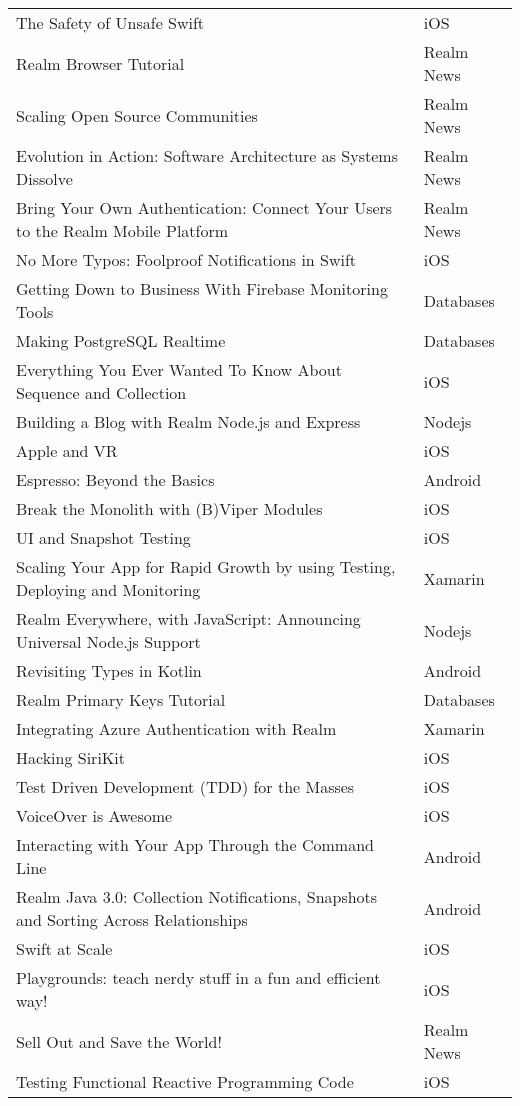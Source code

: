 \documentclass[letterpaper,11pt]{article}
\begin{document}
\begin{table}[htb]
\begin{tabular}{ | l | l |}
The Safety of Unsafe Swift & iOS \\ 
Realm Browser Tutorial & Realm News \\ 
Scaling Open Source Communities & Realm News \\ 
Evolution in Action: Software Architecture as Systems Dissolve & Realm News \\ 
Bring Your Own Authentication: Connect Your Users to the Realm Mobile Platform & Realm News \\ 
No More Typos: Foolproof Notifications in Swift & iOS \\ 
Getting Down to Business With Firebase Monitoring Tools & Databases \\ 
Making PostgreSQL Realtime & Databases \\ 
Everything You Ever Wanted To Know About Sequence and Collection & iOS \\ 
Building a Blog with Realm Node.js and Express & Nodejs \\ 
Apple and VR & iOS \\ 
Espresso: Beyond the Basics & Android  \\ 
Break the Monolith with (B)Viper Modules & iOS \\ 
UI and Snapshot Testing & iOS \\ 
Scaling Your App for Rapid Growth by using Testing, Deploying and Monitoring & Xamarin \\ 
Realm Everywhere, with JavaScript: Announcing Universal Node.js Support & Nodejs \\ 
Revisiting Types in Kotlin & Android \\ 
Realm Primary Keys Tutorial & Databases \\ 
Integrating Azure Authentication with Realm & Xamarin \\ 
Hacking SiriKit & iOS \\ 
Test Driven Development (TDD) for the Masses & iOS \\ 
VoiceOver is Awesome & iOS \\ 
Interacting with Your App Through the Command Line & Android \\ 
Realm Java 3.0: Collection Notifications, Snapshots and Sorting Across Relationships & Android \\ 
Swift at Scale & iOS \\ 
Playgrounds: teach nerdy stuff in a fun and efficient way! & iOS \\ 
Sell Out and Save the World! & Realm News \\ 
Testing Functional Reactive Programming Code & iOS \\ 

\end{tabular}
\end{table}
\end{document}
